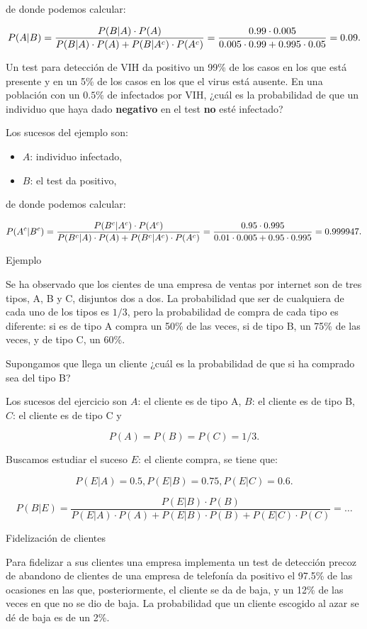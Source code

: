 \documentclass[
  letterpaper,
  DIV=11,
  numbers=noendperiod]{scrreprt}
\providecommand{\tightlist}{%
  \setlength{\itemsep}{0pt}\setlength{\parskip}{0pt}}\usepackage{longtable,booktabs,array}
\begin{document}
de donde podemos calcular:

\[\scriptsize{
P(A|B) =\dfrac{P(B|A)\cdot P(A)}{P(B|A)\cdot P(A)+P(B|A^c)\cdot P(A^c)}=\dfrac{0.99\cdot 0.005}{0.005\cdot 0.99+0.995\cdot 0.05}=0.09.}
\]

Un test para detección de VIH da positivo un 99\% de los casos en los
que está presente y en un 5\% de los casos en los que el virus está
ausente. En una población con un \(0.5\%\) de infectados por VIH, ¿cuál
es la probabilidad de que un individuo que haya dado \textbf{negativo}
en el test \textbf{no} esté infectado?

Los sucesos del ejemplo son:

\begin{itemize}
\tightlist
\item
  \(A\): individuo infectado,
\item
  \(B\): el test da positivo,
\end{itemize}

de donde podemos calcular:

\[
\scriptsize{P(A^c|B^c) =\dfrac{P(B^c|A^c)\cdot P(A^c)}{P(B^c|A)\cdot P(A)+P(B^c|A^c)\cdot P(A^c)}=\dfrac{0.95\cdot 0.995}{0.01\cdot 0.005+0.95\cdot 0.995}=0.999947.}
\]

Ejemplo

Se ha observado que los cientes de una empresa de ventas por internet
son de tres tipos, A, B y C, disjuntos dos a dos. La probabilidad que
ser de cualquiera de cada uno de los tipos es \(1/3\), pero la
probabilidad de compra de cada tipo es diferente: si es de tipo A compra
un 50\% de las veces, si de tipo B, un 75\% de las veces, y de tipo C,
un 60\%.

Supongamos que llega un cliente ¿cuál es la probabilidad de que si ha
comprado sea del tipo B?

Los sucesos del ejercicio son \(A\): el cliente es de tipo A, \(B\): el
cliente es de tipo B, \(C\): el cliente es de tipo C y

\[P(A)=P(B)=P(C)=1/3.\]

Buscamos estudiar el suceso \(E\): el cliente compra, se tiene que:

\[P(E|A)=0.5, P(E|B)=0.75, P(E|C)=0.6.\]

\[P(B|E)\!=\!\dfrac{P(E|B)\cdot P(B)}{P(E|A)\!\cdot\! P(A)\!+\!P(E|B)\!\cdot\! P(B)\!+\!P(E|C)\!\cdot\! P(C)}\!=\!\ldots\]

Fidelización de clientes

Para fidelizar a sus clientes una empresa implementa un test de
detección precoz de abandono de clientes de una empresa de telefonía da
positivo el 97.5\% de las ocasiones en las que, posteriormente, el
cliente se da de baja, y un 12\% de las veces en que no se dio de baja.
La probabilidad que un cliente escogido al azar se dé de baja es de un
2\%.
\end{document}
